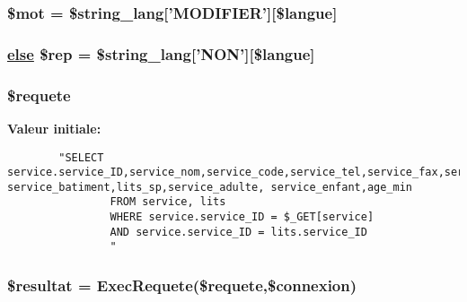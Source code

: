 \hypertarget{service__info_8php_a5}{
\subsubsection[\$mot]{\setlength{\rightskip}{0pt plus 5cm}\$mot = \$string\_\-lang\mbox{[}'MODIFIER'\mbox{]}\mbox{[}\$langue\mbox{]}}}
\label{service__info_8php_a5}


\hypertarget{service__info_8php_a4}{
\subsubsection[\$rep]{\setlength{\rightskip}{0pt plus 5cm}\hyperlink{cron_8php_a9}{else} \$rep = \$string\_\-lang\mbox{[}'NON'\mbox{]}\mbox{[}\$langue\mbox{]}}}
\label{service__info_8php_a4}


\hypertarget{service__info_8php_a1}{
\subsubsection[\$requete]{\setlength{\rightskip}{0pt plus 5cm}\$requete}}
\label{service__info_8php_a1}


{\bf Valeur initiale:}

\footnotesize\begin{verbatim}        "SELECT service.service_ID,service_nom,service_code,service_tel,service_fax,service_etage,
service_batiment,lits_sp,service_adulte, service_enfant,age_min
                FROM service, lits
                WHERE service.service_ID = $_GET[service]
                AND service.service_ID = lits.service_ID
                "
\end{verbatim}\normalsize 
\hypertarget{service__info_8php_a2}{
\subsubsection[\$resultat]{\setlength{\rightskip}{0pt plus 5cm}\$resultat = Exec\-Requete(\$requete,\$connexion)}}
\label{service__info_8php_a2}


